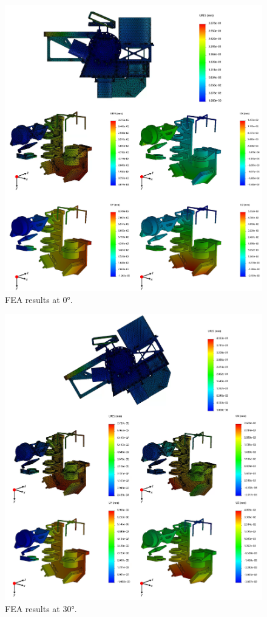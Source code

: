 \documentclass{report}
\begin{document}
\clearpage



\begin{figure}
\centering
\includegraphics[width=1.1\linewidth]{figures/AllFEA0deg.png}
\caption{FEA results at 0°.}
\label{figure:FEAD1a}
\end{figure}

\clearpage

\begin{figure}
\centering
\includegraphics[width=1.1\linewidth]{figures/AllFEA30deg.png}
\caption{FEA results at 30°.}
\label{figure:FEAD1b}
\end{figure}
\end{document}
